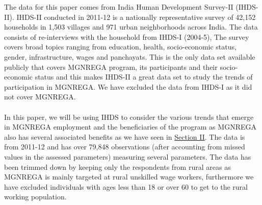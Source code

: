 \documentclass{article}
\begin{document}
The data for this paper comes from India Human Development Survey-II (IHDS-II). IHDS-II conducted in 2011-12 is a nationally representative survey of 42,152 households in 1,503 villages and 971 urban neighborhoods across India. The data consists of re-interviews with the household from IHDS-I (2004-5), The survey covers broad topics ranging from education, health, socio-economic status, gender, infrastructure, wages and panchayats. This is the only data set available publicly that covers MGNREGA program, its participants and their socio-economic status and this makes IHDS-II a great data set to study the trends of participation in MGNREGA. We have excluded the data from IHDS-I as it did not cover MGNREGA.   
\\\\
In this paper, we will be using IHDS to consider the various trends that emerge in MGNREGA employment and the beneficiaries of the program as MGNREGA also has several associated benefits as we have seen in \hyperref[lit]{Section II}. The data is from 2011-12 and has over 79,848 observations (after accounting from missed values in the assessed parameters) measuring several parameters. The data has been trimmed down by keeping only the respondents from rural areas as MGNREGA is mainly targeted at rural unskilled wage workers, furthermore we have excluded individuals with ages less than 18 or over 60 to get to the rural working population.  
\end{document}
